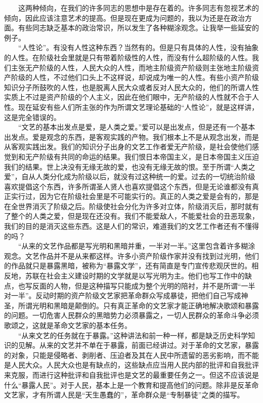 \documentclass[cn,11pt,chinese]{elegantbook}
\begin{document}
　　这两种倾向，在我们的许多同志的思想中是存在着的。许多同志有忽视艺术的倾向，因此应该注意艺术的提高。但是现在更成为问题的，我以为还是在政治方面。有些同志缺乏基本的政治常识，所以发生了各种糊涂观念。让我举一些延安的例子。\\
　　“人性论”。有没有人性这种东西？当然有的。但是只有具体的人性，没有抽象的人性。在阶级社会里就是只有带着阶级性的人性，而没有什么超阶级的人性。我们主张无产阶级的人性，人民大众的人性，而地主阶级资产阶级则主张地主阶级资产阶级的人性，不过他们口头上不这样说，却说成为唯一的人性。有些小资产阶级知识分子所鼓吹的人性，也是脱离人民大众或者反对人民大众的，他们的所谓人性实质上不过是资产阶级的个人主义，因此在他们眼中，无产阶级的人性就不合于人性。现在延安有些人们所主张的作为所谓文艺理论基础的“人性论”，就是这样讲，这是完全错误的。\\
　　“文艺的基本出发点是爱，是人类之爱。”爱可以是出发点，但是还有一个基本出发点。爱是观念的东西，是客观实践的产物。我们根本上不是从观念出发，而是从客观实践出发。我们的知识分子出身的文艺工作者爱无产阶级，是社会使他们感觉到和无产阶级有共同的命运的结果。我们恨日本帝国主义，是日本帝国主义压迫我们的结果。世上决没有无缘无故的爱，也没有无缘无故的恨。至于所谓“人类之爱”，自从人类分化成为阶级以后，就没有过这种统一的爱。过去的一切统治阶级喜欢提倡这个东西，许多所谓圣人贤人也喜欢提倡这个东西，但是无论谁都没有真正实行过，因为它在阶级社会里是不可能实行的。真正的人类之爱是会有的，那是在全世界消灭了阶级之后。阶级使社会分化为许多对立体，阶级消灭后，那时就有了整个的人类之爱，但是现在还没有。我们不能爱敌人，不能爱社会的丑恶现象，我们的目的是消灭这些东西。这是人们的常识，难道我们的文艺工作者还有不懂得的吗？\\
　　“从来的文艺作品都是写光明和黑暗并重，一半对一半。”这里包含着许多糊涂观念。文艺作品并不是从来都这样。许多小资产阶级作家并没有找到过光明，他们的作品就只是暴露黑暗，被称为“暴露文学”，还有简直是专门宣传悲观厌世的。相反地，苏联在社会主义建设时期的文学就是以写光明为主。他们也写工作中的缺点，也写反面的人物，但是这种描写只能成为整个光明的陪衬，并不是所谓“一半对一半”。反动时期的资产阶级文艺家把革命群众写成暴徒，把他们自己写成神圣，所谓光明和黑暗是颠倒的。只有真正革命的文艺家才能正确地解决歌颂和暴露的问题。一切危害人民群众的黑暗势力必须暴露之，一切人民群众的革命斗争必须歌颂之，这就是革命文艺家的基本任务。\\
　　“从来文艺的任务就在于暴露。”这种讲法和前一种一样，都是缺乏历史科学知识的见解。从来的文艺并不单在于暴露，前面已经讲过。对于革命的文艺家，暴露的对象，只能是侵略者、剥削者、压迫者及其在人民中所遗留的恶劣影响，而不能是人民大众。人民大众也是有缺点的，这些缺点应当用人民内部的批评和自我批评来克服，而进行这种批评和自我批评也是文艺的最重要任务之一。但这不应该说是什么“暴露人民”。对于人民，基本上是一个教育和提高他们的问题。除非是反革命文艺家，才有所谓人民是“天生愚蠢的”，革命群众是“专制暴徒”之类的描写。\\
\end{document}
